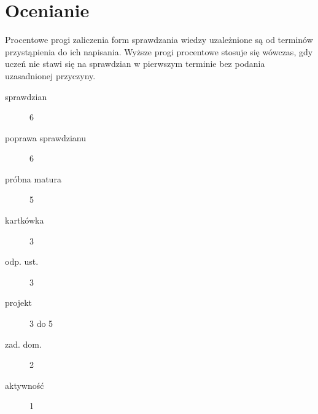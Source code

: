 \documentclass[a4paper]{article}
\begin{document}
\section{Ocenianie}
Procentowe progi zaliczenia form sprawdzania wiedzy uzależnione są od terminów
przystąpienia do ich napisania. Wyższe progi procentowe stosuje się wówczas,
gdy uczeń nie stawi się na sprawdzian w pierwszym terminie bez podania uzasadnionej przyczyny.
\begin{table}[]
    \centering
    \end{table}
\begin{description}
    \item[sprawdzian] 6
    \item[poprawa sprawdzianu] 6
    \item[próbna matura] 5
    \item[kartkówka] 3
    \item[odp. ust.] 3
    \item[projekt] 3 do 5
    \item[zad. dom.] 2
    \item[aktywność] 1
\end{description}
\end{document}
